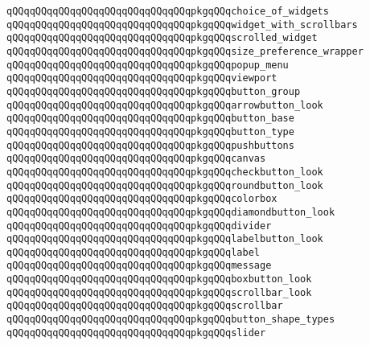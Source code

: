 \verb|qQQqqQQqqQQqqQQqqQQqqQQqqQQqqQQqpkgqQQqchoice_of_widgets|\newline
\verb|qQQqqQQqqQQqqQQqqQQqqQQqqQQqqQQqpkgqQQqwidget_with_scrollbars|\newline
\verb|qQQqqQQqqQQqqQQqqQQqqQQqqQQqqQQqpkgqQQqscrolled_widget|\newline
\verb|qQQqqQQqqQQqqQQqqQQqqQQqqQQqqQQqpkgqQQqsize_preference_wrapper|\newline
\verb|qQQqqQQqqQQqqQQqqQQqqQQqqQQqqQQqpkgqQQqpopup_menu|\newline
\verb|qQQqqQQqqQQqqQQqqQQqqQQqqQQqqQQqpkgqQQqviewport|\newline
\verb|qQQqqQQqqQQqqQQqqQQqqQQqqQQqqQQqpkgqQQqbutton_group|\newline
\verb|qQQqqQQqqQQqqQQqqQQqqQQqqQQqqQQqpkgqQQqarrowbutton_look|\newline
\verb|qQQqqQQqqQQqqQQqqQQqqQQqqQQqqQQqpkgqQQqbutton_base|\newline
\verb|qQQqqQQqqQQqqQQqqQQqqQQqqQQqqQQqpkgqQQqbutton_type|\newline
\verb|qQQqqQQqqQQqqQQqqQQqqQQqqQQqqQQqpkgqQQqpushbuttons|\newline
\verb|qQQqqQQqqQQqqQQqqQQqqQQqqQQqqQQqpkgqQQqcanvas|\newline
\verb|qQQqqQQqqQQqqQQqqQQqqQQqqQQqqQQqpkgqQQqcheckbutton_look|\newline
\verb|qQQqqQQqqQQqqQQqqQQqqQQqqQQqqQQqpkgqQQqroundbutton_look|\newline
\verb|qQQqqQQqqQQqqQQqqQQqqQQqqQQqqQQqpkgqQQqcolorbox|\newline
\verb|qQQqqQQqqQQqqQQqqQQqqQQqqQQqqQQqpkgqQQqdiamondbutton_look|\newline
\verb|qQQqqQQqqQQqqQQqqQQqqQQqqQQqqQQqpkgqQQqdivider|\newline
\verb|qQQqqQQqqQQqqQQqqQQqqQQqqQQqqQQqpkgqQQqlabelbutton_look|\newline
\verb|qQQqqQQqqQQqqQQqqQQqqQQqqQQqqQQqpkgqQQqlabel|\newline
\verb|qQQqqQQqqQQqqQQqqQQqqQQqqQQqqQQqpkgqQQqmessage|\newline
\verb|qQQqqQQqqQQqqQQqqQQqqQQqqQQqqQQqpkgqQQqboxbutton_look|\newline
\verb|qQQqqQQqqQQqqQQqqQQqqQQqqQQqqQQqpkgqQQqscrollbar_look|\newline
\verb|qQQqqQQqqQQqqQQqqQQqqQQqqQQqqQQqpkgqQQqscrollbar|\newline
\verb|qQQqqQQqqQQqqQQqqQQqqQQqqQQqqQQqpkgqQQqbutton_shape_types|\newline
\verb|qQQqqQQqqQQqqQQqqQQqqQQqqQQqqQQqpkgqQQqslider|\newline
